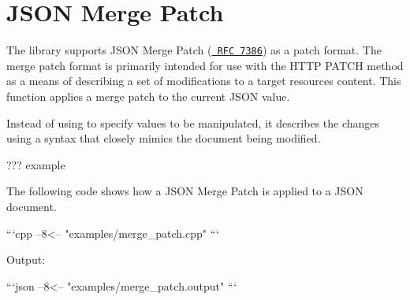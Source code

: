 \chapter{JSON Merge Patch}
\hypertarget{md_build_2dt__core_2__deps_2nlohmann__json-src_2docs_2mkdocs_2docs_2features_2merge__patch}{}\label{md_build_2dt__core_2__deps_2nlohmann__json-src_2docs_2mkdocs_2docs_2features_2merge__patch}
\label{md_build_2dt__core_2__deps_2nlohmann__json-src_2docs_2mkdocs_2docs_2features_2merge__patch_autotoc_md1406}%
%
 The library supports JSON Merge Patch (\href{https://tools.ietf.org/html/rfc7386}{\texttt{ RFC 7386}}) as a patch format. The merge patch format is primarily intended for use with the HTTP PATCH method as a means of describing a set of modifications to a target resource\textquotesingle{}s content. This function applies a merge patch to the current JSON value.

Instead of using  to specify values to be manipulated, it describes the changes using a syntax that closely mimics the document being modified.

??? example \begin{DoxyVerb}The following code shows how a JSON Merge Patch is applied to a JSON document.

```cpp
--8<-- "examples/merge_patch.cpp"
```

Output:

```json
--8<-- "examples/merge_patch.output"
```
\end{DoxyVerb}
 